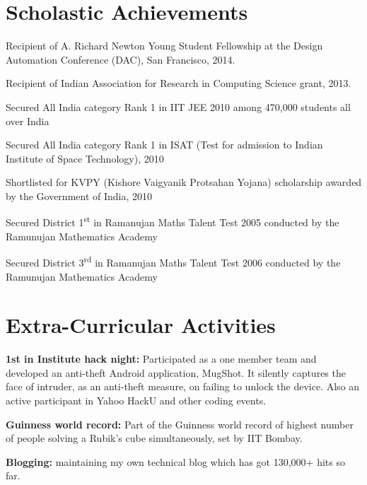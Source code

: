 \documentclass[margin,line]{resume}
\begin{document}
\begin{resume}

\section{\mysidestyle Scholastic Achievements}
\begin{list1}
\item Recipient of A. Richard Newton Young Student Fellowship at the Design Automation Conference (DAC), San Francisco, 2014.
\item Recipient of Indian Association for Research in Computing Science grant, 2013.
\item Secured All India category Rank 1 in IIT JEE 2010 among 470,000 students all over India
\item Secured All India category Rank 1 in ISAT (Test for admission to Indian Institute of Space Technology), 2010
\item Shortlisted for KVPY (Kishore Vaigyanik Protsahan Yojana) scholarship awarded by the Government of India, 2010
\item Secured District 1\textsuperscript{st} in Ramanujan Maths Talent Test 2005 conducted by the Ramunujan Mathematics Academy
\item Secured District 3\textsuperscript{rd} in Ramanujan Maths Talent Test 2006 conducted by the Ramunujan Mathematics Academy
\end{list1}

\pagebreak


\section{\mysidestyle Extra-Curricular Activities}
\begin{list1}
\item {\bf 1st in Institute hack night:} Participated as a one member team and developed an anti-theft Android application, MugShot. It silently captures the face of intruder, as an anti-theft measure, on failing to unlock the device. Also an active participant in Yahoo HackU and other coding events.
\item {\bf Guinness world record:} Part of the Guinness world record of highest number of people solving a Rubik’s cube simultaneously, set by IIT Bombay.
\item {\bf Blogging:} maintaining my own technical blog which has got 130,000+ hits so far.
\end{list1}


\end{resume}
\end{document}
